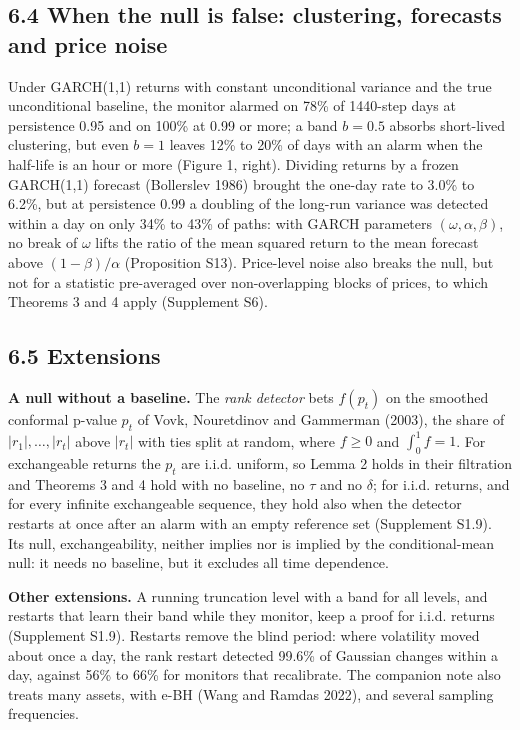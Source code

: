 \documentclass[
]{article}
\begin{document}
\hypertarget{when-the-null-is-false-clustering-forecasts-and-price-noise}{%
\subsection{6.4 When the null is false: clustering, forecasts and price
noise}\label{when-the-null-is-false-clustering-forecasts-and-price-noise}}

Under GARCH(1,1) returns with constant unconditional variance and the
true unconditional baseline, the monitor alarmed on 78\% of 1440-step
days at persistence 0.95 and on 100\% at 0.99 or more; a band
\(b = 0.5\) absorbs short-lived clustering, but even \(b = 1\) leaves
12\% to 20\% of days with an alarm when the half-life is an hour or more
(Figure 1, right). Dividing returns by a frozen GARCH(1,1) forecast
(Bollerslev 1986) brought the one-day rate to 3.0\% to 6.2\%, but at
persistence 0.99 a doubling of the long-run variance was detected within
a day on only 34\% to 43\% of paths: with GARCH parameters
\((\omega, \alpha, \beta)\), no break of \(\omega\) lifts the ratio of
the mean squared return to the mean forecast above \((1-\beta)/\alpha\)
(Proposition S13). Price-level noise also breaks the null, but not for a
statistic pre-averaged over non-overlapping blocks of prices, to which
Theorems 3 and 4 apply (Supplement S6).

\hypertarget{extensions}{%
\subsection{6.5 Extensions}\label{extensions}}

\textbf{A null without a baseline.} The \emph{rank detector} bets
\(f(p_t)\) on the smoothed conformal p-value \(p_t\) of Vovk,
Nouretdinov and Gammerman (2003), the share of
\(\lvert r_1\rvert, \dots, \lvert r_t\rvert\) above \(\lvert r_t\rvert\)
with ties split at random, where \(f \ge 0\) and \(\int_0^1 f = 1\). For
exchangeable returns the \(p_t\) are i.i.d. uniform, so Lemma 2 holds in
their filtration and Theorems 3 and 4 hold with no baseline, no \(\tau\)
and no \(\delta\); for i.i.d. returns, and for every infinite
exchangeable sequence, they hold also when the detector restarts at once
after an alarm with an empty reference set (Supplement S1.9). Its null,
exchangeability, neither implies nor is implied by the conditional-mean
null: it needs no baseline, but it excludes all time dependence.

\textbf{Other extensions.} A running truncation level with a band for
all levels, and restarts that learn their band while they monitor, keep
a proof for i.i.d. returns (Supplement S1.9). Restarts remove the blind
period: where volatility moved about once a day, the rank restart
detected 99.6\% of Gaussian changes within a day, against 56\% to 66\%
for monitors that recalibrate. The companion note also treats many
assets, with e-BH (Wang and Ramdas 2022), and several sampling
frequencies.
\end{document}
